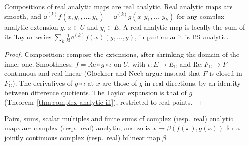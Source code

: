 \begin{theorem}
  \label{thm:real-analytic-basic}
  \leanok
  Compositions of real analytic maps are real analytic. Real analytic maps are smooth, and
  $\dd^{(k)} f(x, y_1, \dots, y_k) = \dd^{(k)} g(x, y_1, \dots, y_k)$ for any complex analytic
  extension $g$, $x \in U$ and $y_i \in E$. A real analytic map is locally the sum of its Taylor
  series $\sum_k \frac{1}{k!} \dd^{(k)} f(x)(y, \dots, y)$; in particular it is BS analytic.
\end{theorem}

\begin{proof}
  \leanok
  Composition: compose the extensions, after shrinking the domain of the inner one. Smoothness:
  $f = \mathrm{Re} \circ g \circ \iota$ on $U$, with $\iota \colon E \to E_{\mathbb{C}}$ and
  $\mathrm{Re} \colon F_{\mathbb{C}} \to F$ continuous and real linear (Glöckner and Neeb argue
  instead that $F$ is closed in $F_{\mathbb{C}}$). The derivatives of $g \circ \iota$ at $x$ are
  those of $g$ in real directions, by an identity between difference quotients. The Taylor
  expansion is that of $g$ (Theorem~\ref{thm:complex-analytic-iff}), restricted to real points.
\end{proof}

\begin{proposition}
  \label{prop:analytic-operations}
  \leanok
  Pairs, sums, scalar multiples and finite sums of complex (resp.\ real) analytic maps are
  complex (resp.\ real) analytic, and so is $x \mapsto \beta(f(x), g(x))$ for a jointly
  continuous complex (resp.\ real) bilinear map $\beta$.
\end{proposition}

